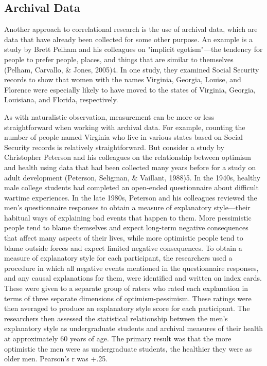 \subsection{Archival Data}


Another approach to correlational research is the use of archival data, which are data that have already been collected for some other purpose. An example is a study by Brett Pelham and his colleagues on "implicit egotism"---the tendency for people to prefer people, places, and things that are similar to themselves (Pelham, Carvallo, \& Jones, 2005)4. In one study, they examined Social Security records to show that women with the names Virginia, Georgia, Louise, and Florence were especially likely to have moved to the states of Virginia, Georgia, Louisiana, and Florida, respectively.


As with naturalistic observation, measurement can be more or less straightforward when working with archival data. For example, counting the number of people named Virginia who live in various states based on Social Security records is relatively straightforward. But consider a study by Christopher Peterson and his colleagues on the relationship between optimism and health using data that had been collected many years before for a study on adult development (Peterson, Seligman, \& Vaillant, 1988)5. In the 1940s, healthy male college students had completed an open-ended questionnaire about difficult wartime experiences. In the late 1980s, Peterson and his colleagues reviewed the men's questionnaire responses to obtain a measure of explanatory style---their habitual ways of explaining bad events that happen to them. More pessimistic people tend to blame themselves and expect long-term negative consequences that affect many aspects of their lives, while more optimistic people tend to blame outside forces and expect limited negative consequences. To obtain a measure of explanatory style for each participant, the researchers used a procedure in which all negative events mentioned in the questionnaire responses, and any causal explanations for them, were identified and written on index cards. These were given to a separate group of raters who rated each explanation in terms of three separate dimensions of optimism-pessimism. These ratings were then averaged to produce an explanatory style score for each participant. The researchers then assessed the statistical relationship between the men's explanatory style as undergraduate students and archival measures of their health at approximately 60 years of age. The primary result was that the more optimistic the men were as undergraduate students, the healthier they were as older men. Pearson's r was +.25.


